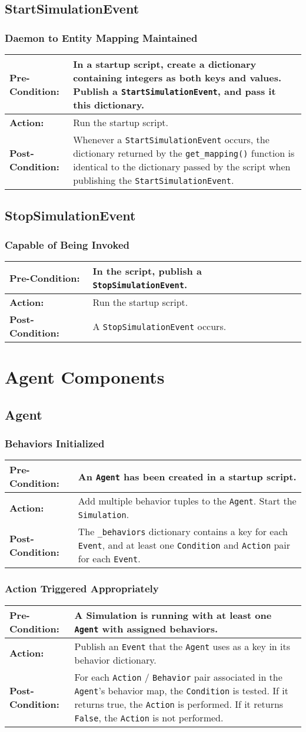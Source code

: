 \documentclass[titlepage]{article}
\newcommand{\testcase}[3]{
    \begin{center}
    \begin{tabular}{| l | p{0.7\textwidth}|}
        \hline
        \rowcolor[gray]{0.8}\textbf{Pre-Condition:} & #1 \\ \hline
        \textbf{Action:} & #2 \\ \hline
        \rowcolor[gray]{0.8}\textbf{Post-Condition:} & #3 \\ \hline
    \end{tabular}
    \end{center}
}
\begin{document}
\subsection{StartSimulationEvent}
\subsubsection{Daemon to Entity Mapping Maintained}
\testcase{In a startup script, create a dictionary containing integers as both keys and values. Publish a \texttt{StartSimulationEvent}, and pass it this dictionary.}{Run the startup script.}{Whenever a \texttt{StartSimulationEvent} occurs, the dictionary returned by the \texttt{get\_mapping()} function is identical to the dictionary passed by the script when publishing the \texttt{StartSimulationEvent}.}

\subsection{StopSimulationEvent}
\subsubsection{Capable of Being Invoked}
\testcase{In the script, publish a \texttt{StopSimulationEvent}.}{Run the startup script.}{A \texttt{StopSimulationEvent} occurs.}

\section{Agent Components}
\subsection{Agent}
\subsubsection{Behaviors Initialized}
\testcase{An \texttt{Agent} has been created in a startup script.}{Add multiple behavior tuples to the \texttt{Agent}. Start the \texttt{Simulation}.}{The \texttt{\_behaviors} dictionary contains a key for each \texttt{Event}, and at least one \texttt{Condition} and \texttt{Action} pair for each \texttt{Event}.}

\subsubsection{Action Triggered Appropriately}
\testcase{A Simulation is running with at least one \texttt{Agent} with assigned behaviors.}{Publish an \texttt{Event} that the \texttt{Agent} uses as a key in its behavior dictionary.}{For each \texttt{Action} / \texttt{Behavior} pair associated in the \texttt{Agent}'s behavior map, the \texttt{Condition} is tested.  If it returns true, the \texttt{Action} is performed.  If it returns \texttt{False}, the \texttt{Action} is not performed.}
\end{document}
